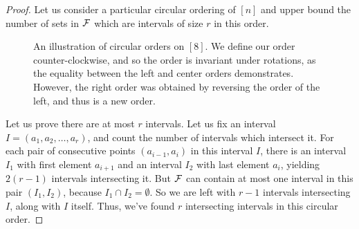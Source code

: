 \begin{proof}	
Let us consider a particular circular ordering of $[n]$ and upper bound the number of sets in $\mathcal{F}$ which are intervals of size $r$ in this order. 
\begin{figure}[ht]
\usetikzlibrary{fit}
\begin{center}
\end{center}
\caption{An illustration of circular orders on $[8]$. We define our order counter-clockwise, and so the order is invariant under rotations, as the equality between the left and center orders demonstrates. However, the right order was obtained by reversing the order of the left, and thus is a new order.}\label{fig:circ_order}
\end{figure}
Let us prove there are at most $r$ intervals.
Let us fix an interval $I= (a_1,a_2,\dotsc,a_r)$, and count the number of intervals which intersect it. For each pair of consecutive points $(a_{i-1},a_i)$ in this interval $I$, there is an interval $I_1$ with first element $a_{i+1}$ and an interval $I_2$ with last element $a_i$, yielding $2(r-1)$ intervals intersecting it. But $\mathcal{F}$ can contain at most one interval in this pair $(I_1,I_2)$, because $I_1\cap I_2=\emptyset$. So we are left with $r-1$ intervals intersecting $I$, along with $I$ itself. Thus, we've found $r$ intersecting intervals in this circular order.


\end{proof}
